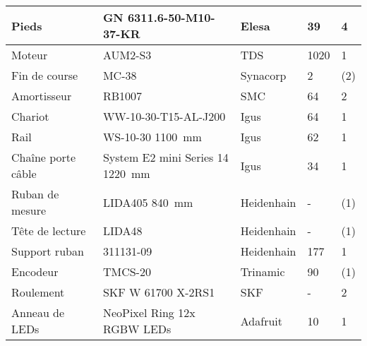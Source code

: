 \begin{table}[H]
{\begin{tabular}{|l|l|l|l|l|}
      Pieds                       & GN 6311.6-50-M10-37-KR           & Elesa \cite{Elesa}              & 39                         & 4                 \\ \hline
      Moteur                      & AUM2-S3                          & TDS \cite{TDSPrecisionProducts} & 1020                       & 1                 \\ \hline
      Fin de course               & MC-38                            & Synacorp \cite{Synacorp}        & 2                          & (2)               \\ \hline
      Amortisseur                 & RB1007                           & SMC \cite{SMC}                  & 64                         & 2                 \\ \hline
      Chariot                     & WW-10-30-T15-AL-J200             & Igus \cite{Igus}                & 64                         & 1                 \\ \hline
      Rail                        & WS-10-30 1100~mm                 & Igus \cite{Igus}                & 62                         & 1                 \\ \hline
      Chaîne porte câble          & System E2 mini Series 14 1220~mm & Igus \cite{Igus}                & 34                         & 1                 \\ \hline
      Ruban de mesure             & LIDA405 840~mm                   & Heidenhain \cite{Heidenhain}    & -                          & (1)               \\ \hline
      Tête de lecture             & LIDA48                           & Heidenhain \cite{Heidenhain}    & -                          & (1)               \\ \hline
      Support ruban               & 311131-09                        & Heidenhain \cite{Heidenhain}    & 177                        & 1                 \\ \hline
      Encodeur                    & TMCS-20                          & Trinamic \cite{Trinamic}        & 90                         & (1)               \\ \hline
      Roulement                   & SKF W 61700 X-2RS1               & SKF \cite{SKF}                  & -                          & 2                 \\ \hline
      Anneau de LEDs              & NeoPixel Ring 12x RGBW LEDs      & Adafruit \cite{Adafruit}        & 10                         & 1                 \\ \hline

\end{tabular}}
\end{table}
